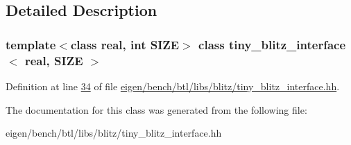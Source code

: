 \subsection{Detailed Description}
\subsubsection*{template$<$class real, int S\+I\+ZE$>$\newline
class tiny\+\_\+blitz\+\_\+interface$<$ real, S\+I\+Z\+E $>$}



Definition at line \hyperlink{eigen_2bench_2btl_2libs_2blitz_2tiny__blitz__interface_8hh_source_l00034}{34} of file \hyperlink{eigen_2bench_2btl_2libs_2blitz_2tiny__blitz__interface_8hh_source}{eigen/bench/btl/libs/blitz/tiny\+\_\+blitz\+\_\+interface.\+hh}.



The documentation for this class was generated from the following file\+:\begin{DoxyCompactItemize}
\item 
eigen/bench/btl/libs/blitz/tiny\+\_\+blitz\+\_\+interface.\+hh\end{DoxyCompactItemize}
